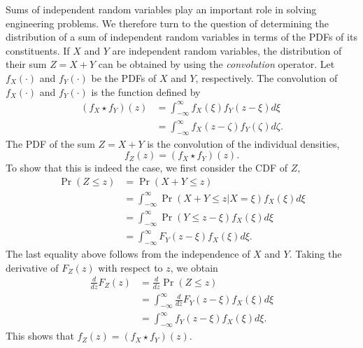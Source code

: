 Sums of independent random variables play an important role in solving engineering problems.
We therefore turn to the question of determining the distribution of a sum of independent random variables in terms of the PDFs of its constituents.
If $X$ and $Y$ are independent random variables, the distribution of their sum $Z = X + Y$ can be obtained by using the \emph{convolution} operator. 
Let $f_X (\cdot)$ and $f_Y (\cdot)$ be the PDFs of $X$ and $Y$, respectively.
The convolution of $f_X(\cdot)$ and $f_Y(\cdot)$ is the function defined by
\begin{equation*}
\begin{split}
(f_X \star f_Y) (z)
&= \int_{-\infty}^{\infty} f_X(\xi) f_Y(z - \xi) d\xi \\
&= \int_{-\infty}^{\infty} f_X(z - \zeta) f_Y(\zeta) d\zeta .
\end{split}
\end{equation*}
The PDF of the sum $Z = X + Y$ is the convolution of the individual densities,
\begin{equation*}
f_Z (z) = (f_X \star f_Y) (z) .
\end{equation*}
To show that this is indeed the case, we first consider the CDF of $Z$,
\begin{equation*}
\begin{split}
\Pr (Z \leq z) &= \Pr (X + Y \leq z) \\
&= \int_{-\infty}^{\infty} \Pr (X + Y \leq z | X = \xi) f_X(\xi) d\xi \\
&= \int_{-\infty}^{\infty} \Pr (Y \leq z - \xi) f_X(\xi) d\xi \\
&= \int_{-\infty}^{\infty} F_Y (z - \xi) f_X(\xi) d\xi .
\end{split}
\end{equation*}
The last equality above follows from the independence of $X$ and $Y$.
Taking the derivative of $F_Z (z)$ with respect to $z$, we obtain
\begin{equation*}
\begin{split}
\frac{d}{dz} F_Z (z) &= \frac{d}{dz} \Pr (Z \leq z) \\
&= \int_{-\infty}^{\infty} \frac{d}{dz} F_Y (z - \xi) f_X(\xi) d\xi \\
&= \int_{-\infty}^{\infty} f_Y (z - \xi) f_X(\xi) d\xi .
\end{split}
\end{equation*}
This shows that $f_Z(z) = (f_X \star f_Y) (z)$.


